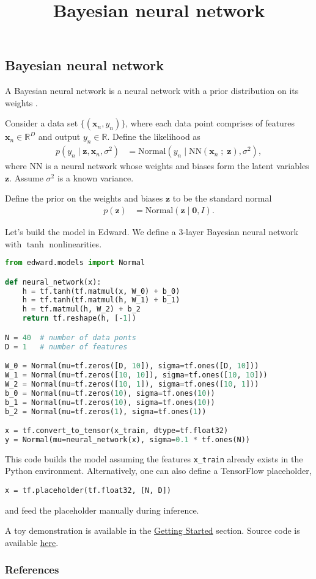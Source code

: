 \title{Bayesian neural network}

\subsection{Bayesian neural network}

A Bayesian neural network is a neural network with a prior
distribution on its weights \citep{neal2012bayesian}.

Consider a data set $\{(\mathbf{x}_n, y_n)\}$, where each data point
comprises of features $\mathbf{x}_n\in\mathbb{R}^D$ and output
$y_n\in\mathbb{R}$. Define the likelihood as
\begin{align*}
  p(y_n \mid \mathbf{z}, \mathbf{x}_n, \sigma^2)
  &=
  \text{Normal}(y_n \mid \mathrm{NN}(\mathbf{x}_n\;;\;\mathbf{z}), \sigma^2),
\end{align*}
where $\mathrm{NN}$ is a neural network whose weights and biases form
the latent variables $\mathbf{z}$. Assume $\sigma^2$ is a
known variance.

Define the prior on the weights and biases $\mathbf{z}$ to be the standard normal
\begin{align*}
  p(\mathbf{z})
  &=
  \text{Normal}(\mathbf{z} \mid \mathbf{0}, I).
\end{align*}

Let's build the model in Edward. We define a 3-layer Bayesian neural
network with $\tanh$ nonlinearities.
\begin{lstlisting}[language=Python]
from edward.models import Normal

def neural_network(x):
    h = tf.tanh(tf.matmul(x, W_0) + b_0)
    h = tf.tanh(tf.matmul(h, W_1) + b_1)
    h = tf.matmul(h, W_2) + b_2
    return tf.reshape(h, [-1])

N = 40  # number of data ponts
D = 1   # number of features

W_0 = Normal(mu=tf.zeros([D, 10]), sigma=tf.ones([D, 10]))
W_1 = Normal(mu=tf.zeros([10, 10]), sigma=tf.ones([10, 10]))
W_2 = Normal(mu=tf.zeros([10, 1]), sigma=tf.ones([10, 1]))
b_0 = Normal(mu=tf.zeros(10), sigma=tf.ones(10))
b_1 = Normal(mu=tf.zeros(10), sigma=tf.ones(10))
b_2 = Normal(mu=tf.zeros(1), sigma=tf.ones(1))

x = tf.convert_to_tensor(x_train, dtype=tf.float32)
y = Normal(mu=neural_network(x), sigma=0.1 * tf.ones(N))
\end{lstlisting}
This code builds the model assuming the features \texttt{x\_train}
already exists in the Python environment. Alternatively, one can also
define a TensorFlow placeholder,
\begin{lstlisting}
x = tf.placeholder(tf.float32, [N, D])
\end{lstlisting}
and feed the placeholder manually during inference.

A toy demonstration is available in the \href{/getting-started}{Getting Started} section.
Source code is available
\href{https://github.com/blei-lab/edward/blob/master/examples/bayesian_nn.py}
{here}.

\subsubsection{References}\label{references}
